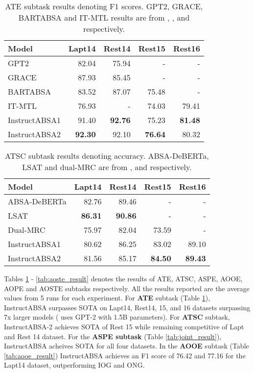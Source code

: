 \documentclass[11pt]{article}
\newcommand{\name}{\textsc{I}nstruct\textsc{ABSA}\xspace}
\begin{document}
\begin{table}[t!]
\centering
\resizebox{\columnwidth}{!}
{
\begin{tabular}{lrrrr}
\hline
\textbf{Model} & \textbf{Lapt14} & \textbf{Rest14} & \textbf{Rest15} & \textbf{Rest16} \\ \hline
GPT2  & 82.04 & 75.94 & - & - \\
GRACE                & 87.93 & 85.45 & - & - \\ 
BARTABSA                & 83.52 & 87.07 & 75.48 & - \\ 
IT-MTL                & 76.93 & - & 74.03 & 79.41 \\ \hline
\name{}1 & 91.40 & \textbf{92.76} & 75.23 & \textbf{81.48} \\
\name{}2 & \textbf{92.30} & 92.10 & \textbf{76.64} & 80.32 \\ \hline
\end{tabular}
}
\caption{ATE subtask results denoting F1 scores. GPT2, GRACE, BARTABSA and IT-MTL results are from \citet{hosseini-asl-etal-2022-generative}, \citet{luo-etal-2020-grace}, \citet{yan-etal-2021-unified} and \citet{varia2023instruction} respectively.}

\label{tab:ate_result}
\end{table} \begin{table}[t!]
\centering
\resizebox{\columnwidth}{!}
{
\begin{tabular}{lrrrr}
\hline
\textbf{Model} & \textbf{Lapt14} & \textbf{Rest14} & \textbf{Rest15} & \textbf{Rest16} \\ \hline
ABSA-DeBERTa        & 82.76 & 89.46 & - & - \\
LSAT       & \textbf{86.31} & \textbf{90.86} & - & - \\ 
Dual-MRC          & 75.97 & 82.04 & 73.59 & - \\ \hline
\name{}1 & 80.62 & 86.25 & 83.02 & 89.10 \\
\name{}2 & 81.56 & 85.17 & \textbf{84.50} & \textbf{89.43} \\ \hline
\end{tabular}
}
\caption{ATSC subtask results denoting accuracy. ABSA-DeBERTa, LSAT and dual-MRC are from \citet{Marcacini2021AspectbasedSA}, \citet{yang2021improving} and \citet{mao2021joint} respectively.}
\label{tab:atsc_result}
\end{table}
 
Tables \ref{tab:ate_result} - \ref{tab:aoste_result} denotes the results of ATE, ATSC, ASPE, AOOE, AOPE and AOSTE subtasks respectively. 
All the results reported are the average values from 5 runs for each experiment.
For \textbf{ATE} subtask (Table \ref{tab:ate_result}), \name{} surpasses SOTA on Lapt14, Rest14, 15, and 16 datasets surpassing 7x larger models (\citet{hosseini-asl-etal-2022-generative} uses GPT-2 with 1.5B parameters).
For \textbf{ATSC} subtask, \name{}-2 achieves SOTA of Rest 15 while remaining competitive of Lapt and Rest 14 dataset.
For the \textbf{ASPE subtask} (Table \ref{tab:joint_result}), \name{} acheives SOTA for all four datasets. 
In the \textbf{AOOE} subtask (Table \ref{tab:aooe_result}) \name{} achieves an F1 score of 76.42 and 77.16 for the Lapt14 dataset, outperforming IOG and ONG. 
\end{document}
